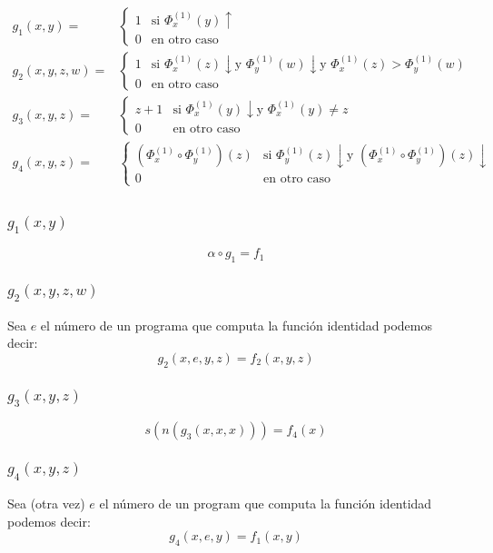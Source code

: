 \documentclass[fleqn, 11pt]{article}
\newcommand{\indef}{\uparrow}
\newcommand{\ddef}{\downarrow}
\begin{document}
\begin{align*}
	g_1(x, y) =&
	\begin{cases}
		1 & \text{si } \Phi^{(1)}_x(y) \indef \\
		0 & \text{en otro caso}
	\end{cases} \\
	g_2(x, y, z, w) =&
	\begin{cases}
		1 & \text{si } \Phi^{(1)}_x(z) \ddef \text{y }
		    \Phi^{(1)}_y(w) \ddef \text{y }
		    \Phi^{(1)}_x(z) > \Phi^{(1)}_y(w) \\
		0 & \text{en otro caso}
	\end{cases} \\
	g_3(x, y, z) =&
	\begin{cases}
		z + 1 & \text{si } \Phi^{(1)}_x(y) \ddef \text{y }
		        \Phi^{(1)}_x(y) \neq z \\
		0     & \text{en otro caso}
	\end{cases} \\
	g_4(x, y, z) =&
	\begin{cases}
		(\Phi^{(1)}_x \circ \Phi^{(1)}_y)(z)
		  & \text{si } \Phi^{(1)}_y(z) \ddef \text{y }
		    (\Phi^{(1)}_x \circ \Phi^{(1)}_y)(z) \ddef \\
		0 & \text{en otro caso}
	\end{cases} \\
\end{align*}

\subsubsection{$g_1(x, y)$}

\[
	\alpha \circ g_1 = f_1
\]

\subsubsection{$g_2(x, y, z, w)$}

Sea $e$ el número de un programa que computa la función identidad podemos decir:
\[
	g_2(x, e, y, z) = f_2(x, y, z)
\]

\subsubsection{$g_3(x, y, z)$}

\[
	s(n(g_3(x, x, x))) = f_4(x)
\]

\subsubsection{$g_4(x, y, z)$}

Sea (otra vez) $e$ el número de un program que computa la función identidad
podemos decir:
\[
	g_4(x, e, y) = f_1(x, y)
\]
\end{document}

